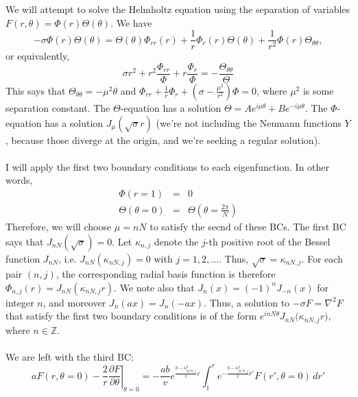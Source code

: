 \documentclass{article}
\begin{document}
We will attempt to solve the Helmholtz equation using the separation of variables $F(r,\theta) = \Phi(r)\Theta(\theta)$.  
We have 
\begin{displaymath}
-\sigma \Phi(r)\Theta(\theta) = \Theta(\theta)\Phi_{rr}(r) + \frac{1}{r}\Phi_{r}(r)\Theta(\theta) + \frac{1}{r^2}\Phi(r)\Theta_{\theta \theta},
\end{displaymath}
or equivalently,
\begin{displaymath}
\sigma r^2 + r^2\frac{\Phi_{rr}}{\Phi} + r \frac{\Phi_r}{\Phi} = -\frac{\Theta_{\theta \theta}}{\Theta}
\end{displaymath}
This says that $\Theta_{\theta \theta} = - \mu^2 \theta$ and $\Phi_{rr} + \frac{1}{r} \Phi_r + \left(\sigma -\frac{\mu^2}{r^2} \right)\Phi  = 0$, where $\mu^2$ is some separation constant.  The $\Theta$-equation has a solution $\Theta = Ae^{i\mu \theta} + Be^{-i\mu \theta}$.  The $\Phi$-equation has a solution $J_{\mu}(\sqrt{\sigma} r)$ (we're not including the Neumann functions $Y$, because those diverge at the origin, and we're seeking a regular solution).  
\\
\\
I will apply the first two boundary conditions to each eigenfunction.  In other words, 
\begin{eqnarray}
\label{eq:bc1} \Phi(r=1) &=& 0  \\
\label{eq:bc2} \Theta(\theta=0) &=& \Theta\left(\theta = \frac{2\pi}{N}\right) 
\end{eqnarray}
Therefore, we will choose $\mu = nN$ to satisfy the secnd of these BCs.  The first BC says that $J_{nN}(\sqrt{\sigma}) = 0$. Let $\kappa_{n,j}$ denote the $j$-th positive root of the Bessel function $J_{nN}$, i.e. $J_{nN}(\kappa_{nN,j}) = 0$ with $j = 1,2,\dots.$
Thus, $\sqrt{\sigma} = \kappa_{nN,j}$.  For each pair $(n,j)$, the corresponding radial basis function is therefore $\Phi_{n,j}(r)
=J_{nN}\left(\kappa_{nN,j}r\right)$.  We note also that $J_n(x) = (-1)^nJ_{-n}(x)$ for integer $n$, and moreover $J_n(ax) = J_n(-ax)$.  Thus, a solution to $-\sigma F = \nabla^2 F$ that satisfy the first two boundary conditions is of the form $e^{i nN\theta}J_{nN}\bigl(\kappa_{nN,j} r\bigr)$, where $n \in\mathbb{Z}$.  
\\
\\
We are left with the third BC:
\begin{displaymath}
\label{eq:bc3} a F(r,\theta=0) - \frac{2}{r} \left.\frac{\partial F}{\partial \theta} \right|_{\theta=0} = -\frac{ab}{v}e^{\frac{b-\kappa_{|n|N, j}^2}{v} r}\int_1^r e^{-\frac{b-\kappa_{|n|N, j}^2}{v} r'} F(r',\theta=0) \,dr' 
\end{displaymath}
\end{document}
